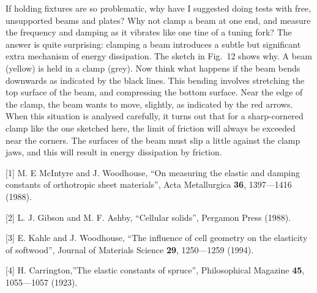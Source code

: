   If holding fixtures are so problematic, why have I suggested doing tests with 
  free, unsupported beams and plates? Why not clamp a beam at one end, and 
  measure the frequency and damping as it vibrates like one tine of a tuning 
  fork? The answer is quite surprising: clamping a beam introduces a subtle but 
  significant extra mechanism of energy dissipation. The sketch in Fig.\ 12 
  shows why. A beam (yellow) is held in a clamp (grey). Now think what happens 
  if the beam bends downwards as indicated by the black lines. This bending 
  involves stretching the top surface of the beam, and compressing the bottom 
  surface. Near the edge of the clamp, the beam wants to move, slightly, as 
  indicated by the red arrows. When this situation is analysed carefully, it 
  turns out that for a sharp-cornered clamp like the one sketched here, the 
  limit of friction will always be exceeded near the corners. The surfaces of 
  the beam must slip a little against the clamp jaws, and this will result in 
  energy dissipation by friction. 




  \sectionreferences{}[1] M. E McIntyre and J. Woodhouse, “On measuring the 
  elastic and damping constants of orthotropic sheet materials”, Acta 
  Metallurgica \textbf{36}, 1397—1416 (1988). 

  [2] L. J. Gibson and M. F. Ashby, “Cellular solids”, Pergamon Press (1988). 

  [3] E. Kahle and J. Woodhouse, “The influence of cell geometry on the 
  elasticity of softwood”, Journal of Materials Science \textbf{29}, 1250—1259 
  (1994). 

  [4] H. Carrington,”The elastic constants of spruce”, Philosophical Magazine 
  \textbf{45}, 1055—1057 (1923). 